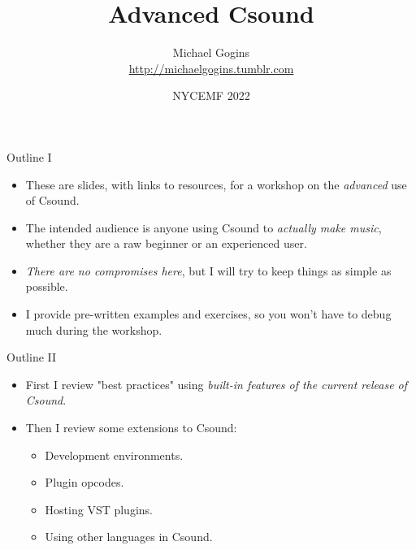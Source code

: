 \documentclass{beamer}
\title{Advanced Csound}
\author[Gogins] %
{Michael Gogins \\ \url{http://michaelgogins.tumblr.com} }
\institute[Irreducible Productions] %
{
    Irreducible Productions\\
    New York
}
\date[NYCEMF 2022] 
{NYCEMF 2022}
\begin{document}

\frame{\titlepage}

    \begin{frame}{Outline I}
        \begin{itemize}
            \item These are slides, with links to resources, for a workshop on the
            \emph{advanced} use of Csound.
            \item The intended audience is anyone using Csound to \textit{actually make
                music}, whether they are a raw beginner or an experienced user.           
             \item \emph{There are no compromises here}, but I will try to keep things
            as simple as possible.
            
            \item I provide pre-written examples and exercises, so you won't have to debug much 
            during the workshop.
        \end{itemize}
    \end{frame}
    
    \begin{frame}{Outline II}
        \begin{itemize}
           \item First I review "best practices" using \textit{built-in features of
            the current release of Csound}.
            \item Then I review some extensions to Csound: 
                \begin{itemize}
                    \item Development environments.
                    \item Plugin opcodes.
                    \item Hosting VST plugins.
                    \item Using other languages in Csound.
                \end{itemize}
        \end{itemize}
    \end{frame}
    
\end{document}
